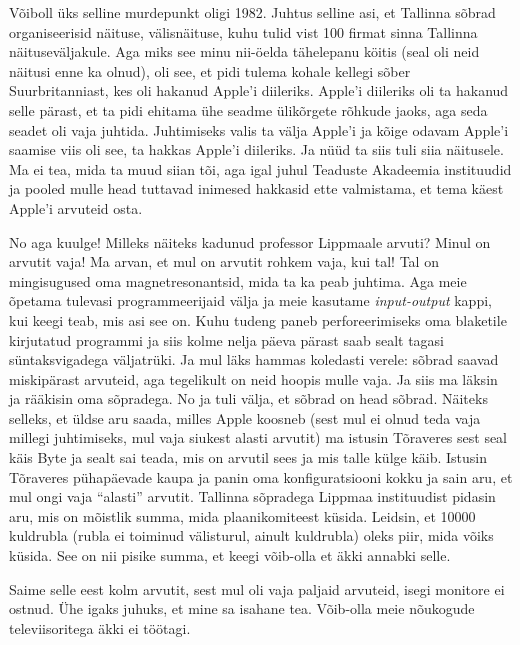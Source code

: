 Võiboll üks selline murdepunkt oligi 1982. Juhtus selline asi, et Tallinna sõbrad organiseerisid näituse, välisnäituse, kuhu tulid vist 100 firmat sinna Tallinna näituseväljakule. Aga miks see minu nii-öelda tähelepanu köitis (seal oli neid näitusi enne ka olnud), oli see, et pidi tulema kohale kellegi sõber Suurbritanniast, kes oli hakanud Apple'i diileriks. Apple'i diileriks oli ta hakanud selle pärast, et ta pidi ehitama ühe seadme ülikõrgete rõhkude jaoks, aga seda seadet oli vaja juhtida. Juhtimiseks valis ta välja Apple'i ja kõige odavam Apple'i saamise viis oli see, ta hakkas Apple'i diileriks. Ja nüüd ta siis tuli siia näitusele. Ma ei tea, mida ta muud siian tõi, aga igal juhul Teaduste Akadeemia instituudid ja pooled mulle head tuttavad inimesed hakkasid ette valmistama, et tema käest Apple'i arvuteid osta. 

No aga kuulge! Milleks näiteks kadunud professor Lippmaale arvuti? Minul on arvutit vaja! Ma arvan, et mul on arvutit rohkem vaja, kui tal! Tal on mingisugused oma magnetresonantsid, mida ta ka peab juhtima. Aga meie õpetama tulevasi programmeerijaid välja ja meie kasutame \emph{input-output} kappi, kui keegi teab, mis asi see on. Kuhu tudeng paneb  perforeerimiseks oma blaketile kirjutatud programmi ja siis kolme nelja päeva pärast saab sealt tagasi süntaksvigadega väljatrüki. Ja mul läks hammas koledasti verele: sõbrad saavad miskipärast arvuteid, aga tegelikult on neid hoopis mulle vaja. Ja siis ma läksin ja rääkisin oma sõpradega. No ja tuli välja, et sõbrad on head sõbrad. Näiteks selleks, et üldse aru saada, milles Apple koosneb (sest mul ei olnud teda vaja millegi juhtimiseks, mul vaja siukest alasti arvutit) ma istusin Tõraveres sest seal käis Byte ja sealt sai teada, mis on arvutil sees ja mis talle külge käib. Istusin Tõraveres pühapäevade kaupa ja panin oma konfiguratsiooni kokku ja sain aru, et mul ongi vaja \enquote{alasti} arvutit. Tallinna sõpradega Lippmaa instituudist pidasin aru, mis on mõistlik summa, mida plaanikomiteest küsida. Leidsin, et 10000 kuldrubla (rubla ei toiminud välisturul, ainult kuldrubla) oleks piir, mida võiks küsida. See on nii pisike summa, et keegi võib-olla et äkki annabki selle. 

Saime selle eest kolm arvutit, sest mul oli vaja paljaid arvuteid, isegi monitore ei ostnud. Ühe igaks juhuks, et mine sa isahane tea. Võib-olla meie nõukogude televiisoritega äkki ei töötagi. 

